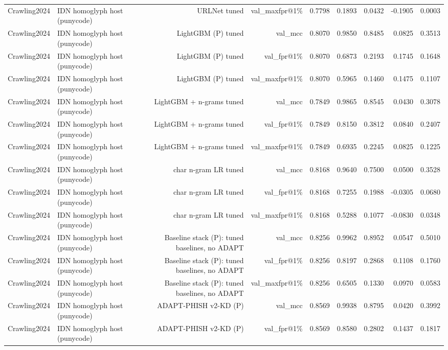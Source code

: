 \begin{table}[t]
\begin{tabular}{llrrrrrrr}
Crawling2024 & IDN homoglyph host (punycode) & URLNet tuned & val\_maxfpr@1\% & 0.7798 & 0.1893 & 0.0432 & -0.1905 & 0.0003 \\
Crawling2024 & IDN homoglyph host (punycode) & LightGBM (P) tuned & val\_mcc & 0.8070 & 0.9850 & 0.8485 & 0.0825 & 0.3513 \\
Crawling2024 & IDN homoglyph host (punycode) & LightGBM (P) tuned & val\_fpr@1\% & 0.8070 & 0.6873 & 0.2193 & 0.1745 & 0.1648 \\
Crawling2024 & IDN homoglyph host (punycode) & LightGBM (P) tuned & val\_maxfpr@1\% & 0.8070 & 0.5965 & 0.1460 & 0.1475 & 0.1107 \\
Crawling2024 & IDN homoglyph host (punycode) & LightGBM + n-grams tuned & val\_mcc & 0.7849 & 0.9865 & 0.8545 & 0.0430 & 0.3078 \\
Crawling2024 & IDN homoglyph host (punycode) & LightGBM + n-grams tuned & val\_fpr@1\% & 0.7849 & 0.8150 & 0.3812 & 0.0840 & 0.2407 \\
Crawling2024 & IDN homoglyph host (punycode) & LightGBM + n-grams tuned & val\_maxfpr@1\% & 0.7849 & 0.6935 & 0.2245 & 0.0825 & 0.1225 \\
Crawling2024 & IDN homoglyph host (punycode) & char n-gram LR tuned & val\_mcc & 0.8168 & 0.9640 & 0.7500 & 0.0500 & 0.3528 \\
Crawling2024 & IDN homoglyph host (punycode) & char n-gram LR tuned & val\_fpr@1\% & 0.8168 & 0.7255 & 0.1988 & -0.0305 & 0.0680 \\
Crawling2024 & IDN homoglyph host (punycode) & char n-gram LR tuned & val\_maxfpr@1\% & 0.8168 & 0.5288 & 0.1077 & -0.0830 & 0.0348 \\
Crawling2024 & IDN homoglyph host (punycode) & Baseline stack (P): tuned baselines, no ADAPT & val\_mcc & 0.8256 & 0.9962 & 0.8952 & 0.0547 & 0.5010 \\
Crawling2024 & IDN homoglyph host (punycode) & Baseline stack (P): tuned baselines, no ADAPT & val\_fpr@1\% & 0.8256 & 0.8197 & 0.2868 & 0.1108 & 0.1760 \\
Crawling2024 & IDN homoglyph host (punycode) & Baseline stack (P): tuned baselines, no ADAPT & val\_maxfpr@1\% & 0.8256 & 0.6505 & 0.1330 & 0.0970 & 0.0583 \\
Crawling2024 & IDN homoglyph host (punycode) & ADAPT-PHISH v2-KD (P) & val\_mcc & 0.8569 & 0.9938 & 0.8795 & 0.0420 & 0.3992 \\
Crawling2024 & IDN homoglyph host (punycode) & ADAPT-PHISH v2-KD (P) & val\_fpr@1\% & 0.8569 & 0.8580 & 0.2802 & 0.1437 & 0.1817 \\

\end{tabular}
\end{table}
